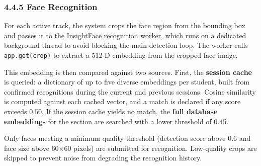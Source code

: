 \documentclass{report}
\begin{document}
\subsubsection*{4.4.5 Face Recognition}
\normalsize{
For each active track, the system crops the face region from the bounding box and passes it to the\vspace{3pt} InsightFace recognition worker, which runs on a dedicated background thread to avoid blocking the\vspace{3pt} main detection loop. The worker calls \texttt{app.get(crop)} to extract a 512-D embedding from the\vspace{3pt} cropped face image.

This embedding is then compared against two sources. First, the \textbf{session cache} is queried:\vspace{3pt} a dictionary of up to five diverse embeddings per student, built from confirmed recognitions during\vspace{3pt} the current and previous sessions. Cosine similarity is computed against each cached vector, and a\vspace{3pt} match is declared if any score exceeds 0.50. If the session cache yields no match, the \textbf{full database\vspace{3pt} embeddings} for the section are searched with a lower threshold of 0.45.

Only faces meeting a minimum quality threshold (detection score above 0.6 and face size above\vspace{3pt} 60$\times$60 pixels) are submitted for recognition. Low-quality crops are skipped to prevent noise from\vspace{3pt} degrading the recognition history.
}
\end{document}
